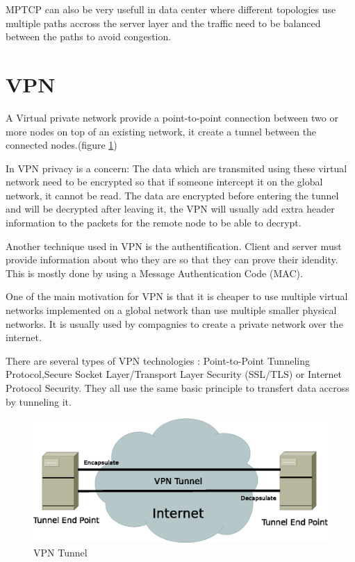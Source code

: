   MPTCP can also be very usefull in data center where different topologies use multiple paths accross the server layer and the traffic need to be balanced between the paths to avoid congestion.

  \section{VPN}

  A Virtual private network provide a point-to-point connection between two or more nodes on top of an existing network, it create a tunnel between the connected nodes.(figure \ref{vpn1})

  In VPN privacy is a concern: The data which are transmited using these virtual network need to be encrypted so that if someone intercept it on the global network, it cannot be read.
  The data are encrypted before entering the tunnel and will be decrypted after leaving it, the VPN will usually add extra header information to the packets for the remote node to be able to decrypt.

  Another technique used in VPN is the authentification. Client and server must provide information about who they are so that they can prove their idendity.
  This is mostly done by using a Message Authentication Code (MAC).

  One of the main motivation for VPN is that it is cheaper to use multiple virtual networks implemented on a global network than use multiple smaller physical networks.
  It is usually used by compagnies to create a private network over the internet.

  There are several types of VPN technologies : Point-to-Point Tunneling Protocol,Secure Socket Layer/Transport Layer Security (SSL/TLS) or Internet Protocol Security.
  They all use the same basic principle to transfert data accross by tunneling it.

  \begin{figure}[h!]
    \centering
    \includegraphics[width=1\textwidth]{./images/vpn1.eps}
    \caption{VPN Tunnel}
    \label{vpn1}
  \end{figure}

